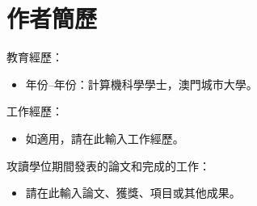 \clearpage
\chapter*{作者簡歷}
{}

\noindent 教育經歷：
\begin{itemize}
  \item 年份--年份：計算機科學學士，澳門城市大學。
\end{itemize}

\vspace{0.5cm}

\noindent 工作經歷：
\begin{itemize}
  \item 如適用，請在此輸入工作經歷。
\end{itemize}

\vspace{0.5cm}

\noindent 攻讀學位期間發表的論文和完成的工作：
\begin{itemize}
  \item 請在此輸入論文、獲獎、項目或其他成果。
\end{itemize}
